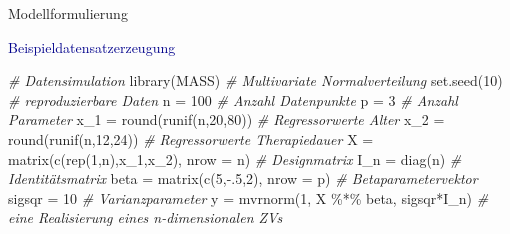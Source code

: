 \documentclass[
  8pt,
  ignorenonframetext,
]{beamer}
\newenvironment{Shaded}{\begin{snugshade}}{\end{snugshade}}
\newcommand{\AttributeTok}[1]{\textcolor[rgb]{0.77,0.63,0.00}{#1}}
\newcommand{\CommentTok}[1]{\textcolor[rgb]{0.56,0.35,0.01}{\textit{#1}}}
\newcommand{\DecValTok}[1]{\textcolor[rgb]{0.00,0.00,0.81}{#1}}
\newcommand{\FunctionTok}[1]{\textcolor[rgb]{0.00,0.00,0.00}{#1}}
\newcommand{\NormalTok}[1]{#1}
\newcommand{\OtherTok}[1]{\textcolor[rgb]{0.56,0.35,0.01}{#1}}
\newcommand{\SpecialCharTok}[1]{\textcolor[rgb]{0.00,0.00,0.00}{#1}}
\begin{document}
\begin{frame}[fragile]{Modellformulierung}
\protect\hypertarget{modellformulierung-1}{}
\vspace{2mm}

\textcolor{darkblue}{Beispieldatensatzerzeugung} \vspace{1mm} \tiny
{}

\begin{Shaded}
\begin{Highlighting}[]
\CommentTok{\# Datensimulation}
\FunctionTok{library}\NormalTok{(MASS)                                          }\CommentTok{\# Multivariate Normalverteilung}
\FunctionTok{set.seed}\NormalTok{(}\DecValTok{10}\NormalTok{)                                           }\CommentTok{\# reproduzierbare Daten}
\NormalTok{n             }\OtherTok{=} \DecValTok{100}                                    \CommentTok{\# Anzahl Datenpunkte}
\NormalTok{p             }\OtherTok{=} \DecValTok{3}                                      \CommentTok{\# Anzahl Parameter}
\NormalTok{x\_1           }\OtherTok{=} \FunctionTok{round}\NormalTok{(}\FunctionTok{runif}\NormalTok{(n,}\DecValTok{20}\NormalTok{,}\DecValTok{80}\NormalTok{))                  }\CommentTok{\# Regressorwerte Alter}
\NormalTok{x\_2           }\OtherTok{=} \FunctionTok{round}\NormalTok{(}\FunctionTok{runif}\NormalTok{(n,}\DecValTok{12}\NormalTok{,}\DecValTok{24}\NormalTok{))                  }\CommentTok{\# Regressorwerte Therapiedauer}
\NormalTok{X             }\OtherTok{=} \FunctionTok{matrix}\NormalTok{(}\FunctionTok{c}\NormalTok{(}\FunctionTok{rep}\NormalTok{(}\DecValTok{1}\NormalTok{,n),x\_1,x\_2), }\AttributeTok{nrow =}\NormalTok{ n)  }\CommentTok{\# Designmatrix}
\NormalTok{I\_n           }\OtherTok{=} \FunctionTok{diag}\NormalTok{(n)                                }\CommentTok{\# Identitätsmatrix}
\NormalTok{beta          }\OtherTok{=} \FunctionTok{matrix}\NormalTok{(}\FunctionTok{c}\NormalTok{(}\DecValTok{5}\NormalTok{,}\SpecialCharTok{{-}}\NormalTok{.}\DecValTok{5}\NormalTok{,}\DecValTok{2}\NormalTok{), }\AttributeTok{nrow =}\NormalTok{ p)           }\CommentTok{\# Betaparametervektor}
\NormalTok{sigsqr        }\OtherTok{=} \DecValTok{10}                                     \CommentTok{\# Varianzparameter}
\NormalTok{y             }\OtherTok{=} \FunctionTok{mvrnorm}\NormalTok{(}\DecValTok{1}\NormalTok{, X }\SpecialCharTok{\%*\%}\NormalTok{ beta, sigsqr}\SpecialCharTok{*}\NormalTok{I\_n)     }\CommentTok{\# eine Realisierung eines n{-}dimensionalen ZVs}


\end{Highlighting}
\end{Shaded}
\end{frame}
\end{document}

